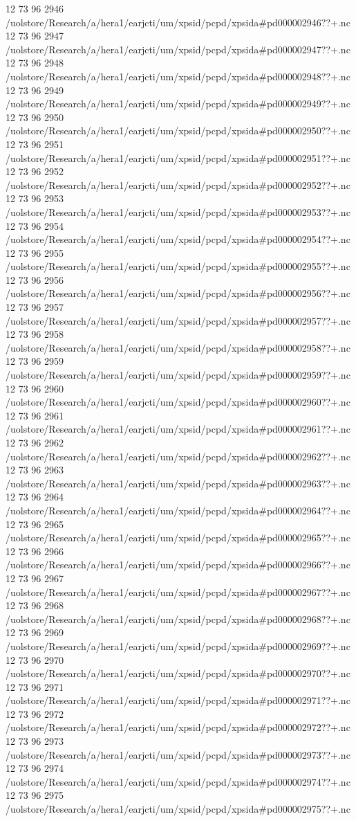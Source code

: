 12 73 96
2946
/uolstore/Research/a/hera1/earjcti/um/xpsid/pcpd/xpsida#pd000002946??+.nc
12 73 96
2947
/uolstore/Research/a/hera1/earjcti/um/xpsid/pcpd/xpsida#pd000002947??+.nc
12 73 96
2948
/uolstore/Research/a/hera1/earjcti/um/xpsid/pcpd/xpsida#pd000002948??+.nc
12 73 96
2949
/uolstore/Research/a/hera1/earjcti/um/xpsid/pcpd/xpsida#pd000002949??+.nc
12 73 96
2950
/uolstore/Research/a/hera1/earjcti/um/xpsid/pcpd/xpsida#pd000002950??+.nc
12 73 96
2951
/uolstore/Research/a/hera1/earjcti/um/xpsid/pcpd/xpsida#pd000002951??+.nc
12 73 96
2952
/uolstore/Research/a/hera1/earjcti/um/xpsid/pcpd/xpsida#pd000002952??+.nc
12 73 96
2953
/uolstore/Research/a/hera1/earjcti/um/xpsid/pcpd/xpsida#pd000002953??+.nc
12 73 96
2954
/uolstore/Research/a/hera1/earjcti/um/xpsid/pcpd/xpsida#pd000002954??+.nc
12 73 96
2955
/uolstore/Research/a/hera1/earjcti/um/xpsid/pcpd/xpsida#pd000002955??+.nc
12 73 96
2956
/uolstore/Research/a/hera1/earjcti/um/xpsid/pcpd/xpsida#pd000002956??+.nc
12 73 96
2957
/uolstore/Research/a/hera1/earjcti/um/xpsid/pcpd/xpsida#pd000002957??+.nc
12 73 96
2958
/uolstore/Research/a/hera1/earjcti/um/xpsid/pcpd/xpsida#pd000002958??+.nc
12 73 96
2959
/uolstore/Research/a/hera1/earjcti/um/xpsid/pcpd/xpsida#pd000002959??+.nc
12 73 96
2960
/uolstore/Research/a/hera1/earjcti/um/xpsid/pcpd/xpsida#pd000002960??+.nc
12 73 96
2961
/uolstore/Research/a/hera1/earjcti/um/xpsid/pcpd/xpsida#pd000002961??+.nc
12 73 96
2962
/uolstore/Research/a/hera1/earjcti/um/xpsid/pcpd/xpsida#pd000002962??+.nc
12 73 96
2963
/uolstore/Research/a/hera1/earjcti/um/xpsid/pcpd/xpsida#pd000002963??+.nc
12 73 96
2964
/uolstore/Research/a/hera1/earjcti/um/xpsid/pcpd/xpsida#pd000002964??+.nc
12 73 96
2965
/uolstore/Research/a/hera1/earjcti/um/xpsid/pcpd/xpsida#pd000002965??+.nc
12 73 96
2966
/uolstore/Research/a/hera1/earjcti/um/xpsid/pcpd/xpsida#pd000002966??+.nc
12 73 96
2967
/uolstore/Research/a/hera1/earjcti/um/xpsid/pcpd/xpsida#pd000002967??+.nc
12 73 96
2968
/uolstore/Research/a/hera1/earjcti/um/xpsid/pcpd/xpsida#pd000002968??+.nc
12 73 96
2969
/uolstore/Research/a/hera1/earjcti/um/xpsid/pcpd/xpsida#pd000002969??+.nc
12 73 96
2970
/uolstore/Research/a/hera1/earjcti/um/xpsid/pcpd/xpsida#pd000002970??+.nc
12 73 96
2971
/uolstore/Research/a/hera1/earjcti/um/xpsid/pcpd/xpsida#pd000002971??+.nc
12 73 96
2972
/uolstore/Research/a/hera1/earjcti/um/xpsid/pcpd/xpsida#pd000002972??+.nc
12 73 96
2973
/uolstore/Research/a/hera1/earjcti/um/xpsid/pcpd/xpsida#pd000002973??+.nc
12 73 96
2974
/uolstore/Research/a/hera1/earjcti/um/xpsid/pcpd/xpsida#pd000002974??+.nc
12 73 96
2975
/uolstore/Research/a/hera1/earjcti/um/xpsid/pcpd/xpsida#pd000002975??+.nc
